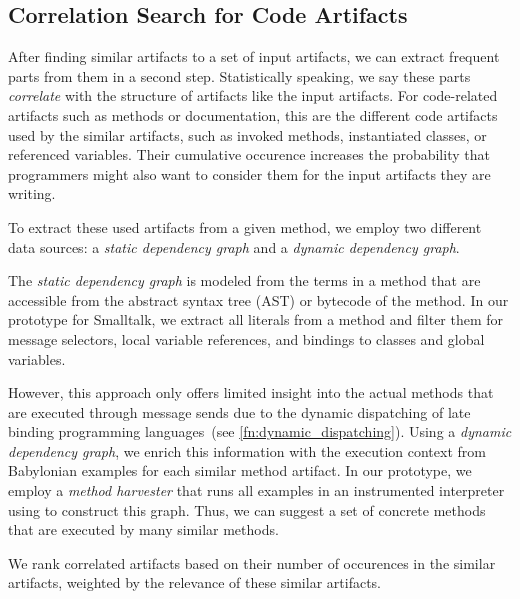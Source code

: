 \subsection{Correlation Search for Code Artifacts}
\label{sec:suggestions/search/correlations}


After finding similar artifacts to a set of input artifacts, we can extract frequent parts from them in a second step.
Statistically speaking, we say these parts \emph{correlate} with the structure of artifacts like the input artifacts.
For code-related artifacts such as methods or documentation, this are the different code artifacts used by the similar artifacts, such as invoked methods, instantiated classes, or referenced variables.
Their cumulative occurence increases the probability that programmers might also want to consider them for the input artifacts they are writing. %

To extract these used artifacts from a given method, we employ two different data sources: a \emph{static dependency graph} and a \emph{dynamic dependency graph}.

The \emph{static dependency graph} is modeled from the terms in a method that are accessible from the abstract syntax tree (AST) or bytecode of the method.
In our prototype for Smalltalk, we extract all literals from a method and filter them for message selectors, local variable references, and bindings to classes and global variables.

However, this approach only offers limited insight into the actual methods that are executed through message sends due to the dynamic dispatching of late binding programming languages~(see \cref{fn:dynamic_dispatching}).
Using a \emph{dynamic dependency graph}, we enrich this information with the execution context from Babylonian examples for each similar method artifact.
In our prototype, we employ a \emph{method harvester} that runs all examples in an instrumented interpreter using  to construct this graph.
Thus, we can suggest a set of concrete methods that are executed by many similar methods.

We rank correlated artifacts based on their number of occurences in the similar artifacts, weighted by the relevance of these similar artifacts.


